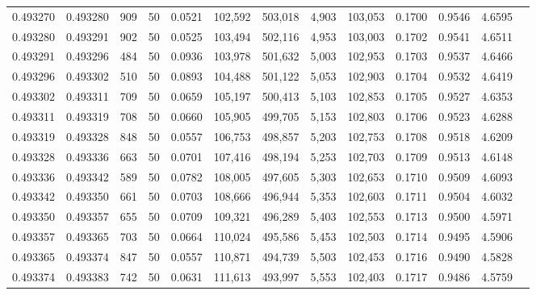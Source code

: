 \begin{tabular}{rrrrrrrrrrrrr}
0.493270 & 0.493280 &   909 &  50 &                                     0.0521 & 102,592 & 503,018 &   4,903 & 103,053 & 0.1700 & 0.9546 & 4.6595 \\
0.493280 & 0.493291 &   902 &  50 &                                     0.0525 & 103,494 & 502,116 &   4,953 & 103,003 & 0.1702 & 0.9541 & 4.6511 \\
0.493291 & 0.493296 &   484 &  50 &                                     0.0936 & 103,978 & 501,632 &   5,003 & 102,953 & 0.1703 & 0.9537 & 4.6466 \\
0.493296 & 0.493302 &   510 &  50 &                                     0.0893 & 104,488 & 501,122 &   5,053 & 102,903 & 0.1704 & 0.9532 & 4.6419 \\
0.493302 & 0.493311 &   709 &  50 &                                     0.0659 & 105,197 & 500,413 &   5,103 & 102,853 & 0.1705 & 0.9527 & 4.6353 \\
0.493311 & 0.493319 &   708 &  50 &                                     0.0660 & 105,905 & 499,705 &   5,153 & 102,803 & 0.1706 & 0.9523 & 4.6288 \\
0.493319 & 0.493328 &   848 &  50 &                                     0.0557 & 106,753 & 498,857 &   5,203 & 102,753 & 0.1708 & 0.9518 & 4.6209 \\
0.493328 & 0.493336 &   663 &  50 &                                     0.0701 & 107,416 & 498,194 &   5,253 & 102,703 & 0.1709 & 0.9513 & 4.6148 \\
0.493336 & 0.493342 &   589 &  50 &                                     0.0782 & 108,005 & 497,605 &   5,303 & 102,653 & 0.1710 & 0.9509 & 4.6093 \\
0.493342 & 0.493350 &   661 &  50 &                                     0.0703 & 108,666 & 496,944 &   5,353 & 102,603 & 0.1711 & 0.9504 & 4.6032 \\
0.493350 & 0.493357 &   655 &  50 &                                     0.0709 & 109,321 & 496,289 &   5,403 & 102,553 & 0.1713 & 0.9500 & 4.5971 \\
0.493357 & 0.493365 &   703 &  50 &                                     0.0664 & 110,024 & 495,586 &   5,453 & 102,503 & 0.1714 & 0.9495 & 4.5906 \\
0.493365 & 0.493374 &   847 &  50 &                                     0.0557 & 110,871 & 494,739 &   5,503 & 102,453 & 0.1716 & 0.9490 & 4.5828 \\
0.493374 & 0.493383 &   742 &  50 &                                     0.0631 & 111,613 & 493,997 &   5,553 & 102,403 & 0.1717 & 0.9486 & 4.5759 \\

\end{tabular}
